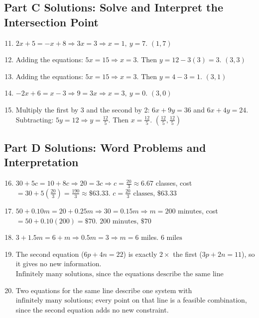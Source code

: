 \documentclass[14pt]{extarticle}
\begin{document}
\subsection*{Part C Solutions: Solve and Interpret the Intersection Point}
\begin{enumerate}
    \setcounter{enumi}{10}
    \item \(2x+5=-x+8 \Rightarrow 3x=3 \Rightarrow x=1,\ y=7\). \(\boxed{(1,7)}\)
    \item Adding the equations: \(5x=15 \Rightarrow x=3\). Then \(y=12-3(3)=3\). \(\boxed{(3,3)}\)
    \item Adding the equations: \(5x=15 \Rightarrow x=3\). Then \(y=4-3=1\). \(\boxed{(3,1)}\)
    \item \(-2x+6=x-3 \Rightarrow 9=3x \Rightarrow x=3,\ y=0\). \(\boxed{(3,0)}\)
    \item Multiply the first by 3 and the second by 2: \(6x+9y=36\) and \(6x+4y=24\). Subtracting: \(5y=12 \Rightarrow y=\tfrac{12}{5}\). Then \(x=\tfrac{12}{5}\). \(\boxed{\left(\tfrac{12}{5}, \tfrac{12}{5}\right)}\)
\end{enumerate}

\subsection*{Part D Solutions: Word Problems and Interpretation}
\begin{enumerate}
    \setcounter{enumi}{15}
    \item \(30+5c=10+8c \Rightarrow 20=3c \Rightarrow c=\tfrac{20}{3}\approx 6.67\) classes, cost \(=30+5\left(\tfrac{20}{3}\right)=\tfrac{190}{3}\approx\$63.33\). \(\boxed{c=\tfrac{20}{3}\text{ classes, } \$63.33}\)
    \item \(50+0.10m=20+0.25m \Rightarrow 30=0.15m \Rightarrow m=200\) minutes, cost \(=50+0.10(200)=\$70\). \(\boxed{200\text{ minutes, } \$70}\)
    \item \(3+1.5m=6+m \Rightarrow 0.5m=3 \Rightarrow m=6\) miles. \(\boxed{6\text{ miles}}\)
    \item The second equation (\(6p+4n=22\)) is exactly \(2\times\) the first (\(3p+2n=11\)), so it gives no new information. \(\boxed{\text{Infinitely many solutions, since the equations describe the same line}}\)
    \item Two equations for the same line describe one system with \(\boxed{\text{infinitely many solutions}}\); every point on that line is a feasible combination, since the second equation adds no new constraint.
\end{enumerate}


\end{document}
